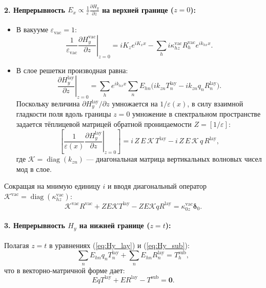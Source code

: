 \documentclass[a4paper,11pt]{article}
\begin{document}
\paragraph{2. Непрерывность $E_x \propto \frac{1}{\varepsilon} \frac{\partial H_y}{\partial z}$ на верхней границе ($z = 0$):}
\begin{itemize}
    \item В вакууме $\varepsilon_{\text{vac}} = 1$:
    \begin{equation}
        \left.\frac{1}{\varepsilon_{\text{vac}}} \frac{\partial H_y^{\text{vac}}}{\partial z}\right|_{z=0} = i K_z e^{i K_x x} - \sum_h i \kappa_{hz}^{\text{vac}} R_h^{\text{vac}} e^{i k_{hx} x}.
    \end{equation}
    \item В слое решетки производная равна:
    \begin{equation}
        \left.\frac{\partial H_y^{\text{lay}}}{\partial z}\right|_{z=0} = \sum_h e^{i k_{hx} x} \sum_n E_{hn} \big( i k_{zn} T_n^{\text{lay}} - i k_{zn} q_n R_n^{\text{lay}} \big).
    \end{equation}
    Поскольку величина $\partial H_y^{\text{lay}} / \partial z$ умножается на $1/\varepsilon(x)$, в силу взаимной гладкости поля вдоль границы $z = 0$ умножение в спектральном пространстве задается тёплицевой матрицей обратной проницаемости $Z = [1/\varepsilon]$:
    \begin{equation}
        \left[ \frac{1}{\varepsilon(x)} \left.\frac{\partial H_y^{\text{lay}}}{\partial z}\right|_{z=0} \right] = i \, Z \, E \, \mathcal{K} \, T^{\text{lay}} - i \, Z \, E \, \mathcal{K} \, q \, R^{\text{lay}},
    \end{equation}
    где $\mathcal{K} = \operatorname{diag}(k_{zn})$ — диагональная матрица вертикальных волновых чисел мод в слое.
\end{itemize}
Сокращая на мнимую единицу $i$ и вводя диагональный оператор $\mathcal{K}^{\text{vac}} = \operatorname{diag}(\kappa_{hz}^{\text{vac}})$:
\begin{equation}
    \mathcal{K}^{\text{vac}} R^{\text{vac}} + Z E \mathcal{K} T^{\text{lay}} - Z E \mathcal{K} q R^{\text{lay}} = \kappa_{0z}^{\text{vac}} \boldsymbol{\delta}_0.
    \label{eq:bc2_p}
\end{equation}

\paragraph{3. Непрерывность $H_y$ на нижней границе ($z = t$):}
Полагая $z = t$ в уравнениях (\ref{eq:Hy_lay}) и (\ref{eq:Hy_sub}):
\begin{equation}
    \sum_n E_{hn} q_n T_n^{\text{lay}} + \sum_n E_{hn} R_n^{\text{lay}} = T_h^{\text{sub}},
\end{equation}
что в векторно-матричной форме дает:
\begin{equation}
    E q T^{\text{lay}} + E R^{\text{lay}} - T^{\text{sub}} = \mathbf{0}.
    \label{eq:bc3_p}
\end{equation}
\end{document}
